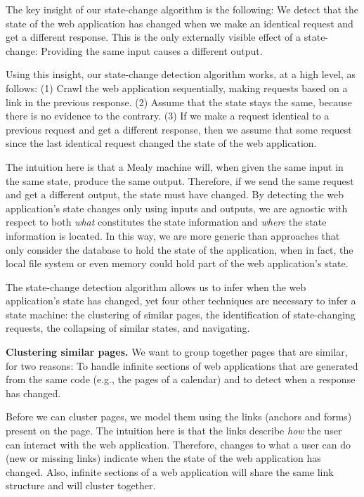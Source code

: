 The key insight of our state-change algorithm is the following: We detect
that the state of the web application has changed when we make an identical
request and get a different response. This is the only externally visible
effect of a state-change: Providing the same input causes a different output.

Using this insight, our state-change detection algorithm works, at a high level,
as follows: (1) Crawl the web application sequentially, making requests based on
a link in the previous response. (2) Assume that the state stays the same,
because there is no evidence to the contrary. (3) If we make a request identical
to a previous request and get a different response, then we assume that some
request since the last identical request changed the state of the web
application.

The intuition here is that a Mealy machine will, when given the same input in
the same state, produce the same output. Therefore, if we send the same request
and get a different output, the state must have changed. By detecting the web
application's state changes only using inputs and outputs, we are agnostic with
respect to both \emph{what} constitutes the state information and \emph{where}
the state information is located. In this way, we are more generic than
approaches that only consider the database to hold the state of the
application, when in fact, the local file system or even memory could hold part
of the web application's state.

The state-change detection algorithm allows us to infer when the web
application's state has changed, yet four other techniques
are necessary to infer a state machine: the clustering of
similar pages, the identification of state-changing requests, the collapsing of
similar states, and navigating.

\noindent \textbf{Clustering similar pages.}
We want to group together pages that are similar, for two reasons: To handle
infinite sections of web applications that are generated from the same
code (e.g., the pages of a calendar) and to detect when a response has changed.

Before we can cluster pages, we model them using the links (anchors and forms) present on
the page. The intuition here is that the links describe \emph{how}
the user can interact with the web application. Therefore, changes to what a
user can do (new or missing links) indicate when the state of the web
application has changed. Also, infinite sections of a web application will
share the same link structure and will cluster together. 

